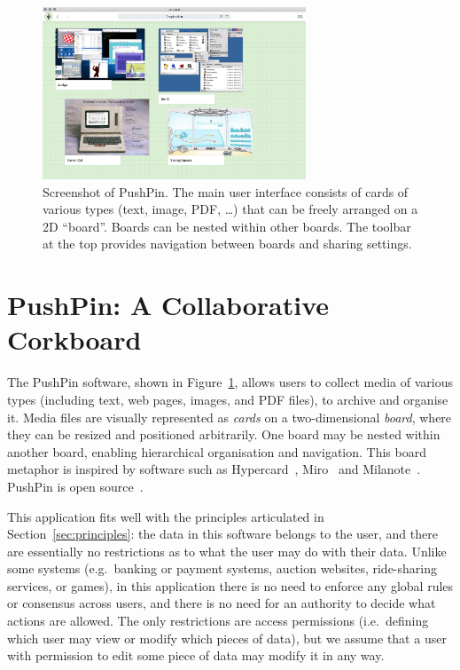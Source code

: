 \documentclass[sigplan,10pt]{acmart}
\begin{document}
\begin{figure}
    \centering
    \includegraphics[width=0.7\textwidth]{pushpin.jpg}
    \caption{Screenshot of PushPin. The main user interface consists of cards of various types (text, image, PDF, \dots) that can be freely arranged on a 2D ``board''. Boards can be nested within other boards. The toolbar at the top provides navigation between boards and sharing settings.}
    \label{fig:pushpin}
\end{figure}

\section{PushPin: A Collaborative Corkboard}\label{sec:pushpin}

The PushPin software, shown in Figure~\ref{fig:pushpin}, allows users to collect media of various types (including text, web pages, images, and PDF files), to archive and organise it.
Media files are visually represented as \emph{cards} on a two-dimensional \emph{board}, where they can be resized and positioned arbitrarily.
One board may be nested within another board, enabling hierarchical organisation and navigation.
This board metaphor is inspired by software such as Hypercard~\cite{HyperCard}, Miro~\cite{Miro} and Milanote~\cite{Milanote}.
PushPin is open source~\cite{PushPinSource}.

This application fits well with the principles articulated in Section~\ref{sec:principles}: the data in this software belongs to the user, and there are essentially no restrictions as to what the user may do with their data.
Unlike some systems (e.g.\ banking or payment systems, auction websites, ride-sharing services, or games), in this application there is no need to enforce any global rules or consensus across users, and there is no need for an authority to decide what actions are allowed.
The only restrictions are access permissions (i.e.\ defining which user may view or modify which pieces of data), but we assume that a user with permission to edit some piece of data may modify it in any way.
\end{document}
